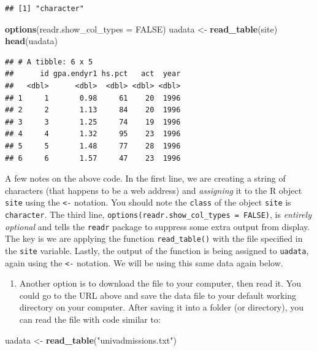 \documentclass[
]{book}
\newenvironment{Shaded}{\begin{snugshade}}{\end{snugshade}}
\newcommand{\AttributeTok}[1]{\textcolor[rgb]{0.13,0.29,0.53}{#1}}
\newcommand{\ConstantTok}[1]{\textcolor[rgb]{0.56,0.35,0.01}{#1}}
\newcommand{\FunctionTok}[1]{\textcolor[rgb]{0.13,0.29,0.53}{\textbf{#1}}}
\newcommand{\NormalTok}[1]{#1}
\newcommand{\OtherTok}[1]{\textcolor[rgb]{0.56,0.35,0.01}{#1}}
\newcommand{\StringTok}[1]{\textcolor[rgb]{0.31,0.60,0.02}{#1}}
\providecommand{\tightlist}{%
  \setlength{\itemsep}{0pt}\setlength{\parskip}{0pt}}
\begin{document}
\begin{verbatim}
## [1] "character"
\end{verbatim}

\begin{Shaded}
\begin{Highlighting}[]
\FunctionTok{options}\NormalTok{(}\AttributeTok{readr.show\_col\_types =} \ConstantTok{FALSE}\NormalTok{)}
\NormalTok{uadata }\OtherTok{\textless{}{-}} \FunctionTok{read\_table}\NormalTok{(site)}
\FunctionTok{head}\NormalTok{(uadata)}
\end{Highlighting}
\end{Shaded}

\begin{verbatim}
## # A tibble: 6 x 5
##      id gpa.endyr1 hs.pct   act  year
##   <dbl>      <dbl>  <dbl> <dbl> <dbl>
## 1     1       0.98     61    20  1996
## 2     2       1.13     84    20  1996
## 3     3       1.25     74    19  1996
## 4     4       1.32     95    23  1996
## 5     5       1.48     77    28  1996
## 6     6       1.57     47    23  1996
\end{verbatim}

A few notes on the above code. In the first line, we are creating a string of characters (that happens to be a web address) and \emph{assigning} it to the R object \texttt{site} using the \texttt{\textless{}-} notation. You should note the \texttt{class} of the object \texttt{site} is \texttt{character}. The third line, \texttt{options(readr.show\_col\_types\ =\ FALSE)}, is \emph{entirely optional} and tells the \texttt{readr} package to suppress some extra output from display. The key is we are applying the function \texttt{read\_table()} with the file specified in the \texttt{site} variable. Lastly, the output of the function is being assigned to \texttt{uadata}, again using the \texttt{\textless{}-} notation. We will be using this same data again below.

\begin{enumerate}
\def\labelenumi{\arabic{enumi}.}
\setcounter{enumi}{1}
\tightlist
\item
  Another option is to download the file to your computer, then read it. You could go to the URL above and save the data file to your default working directory on your computer. After saving it into a folder (or directory), you can read the file with code similar to:
\end{enumerate}

\begin{Shaded}
\begin{Highlighting}[]
\NormalTok{uadata }\OtherTok{\textless{}{-}} \FunctionTok{read\_table}\NormalTok{(}\StringTok{"univadmissions.txt"}\NormalTok{)}
\end{Highlighting}
\end{Shaded}
\end{document}
